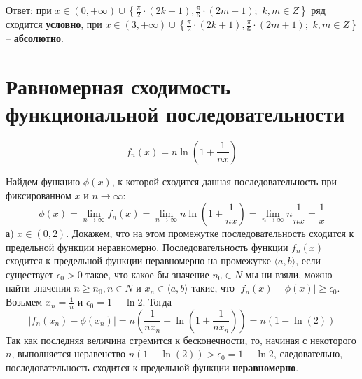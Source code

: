 \documentclass[a5paper, 10pt]{article}
\theoremstyle{definition}
\theoremstyle{plain}
\theoremstyle{remark}
\begin{document}
\underline{Ответ:} при $x \in (0, + \infty)  \cup \left\{  \frac{\pi}{2} \cdot (2k + 1), \frac{\pi}{6} \cdot (2m + 1); \,\, k ,  m\in Z\right\}$  ряд сходится \textbf{условно}, при $x \in (3, + \infty)  \cup \left\{  \frac{\pi}{2} \cdot (2k + 1), \frac{\pi}{6} \cdot (2m + 1); \,\, k ,  m\in Z\right\}$  -- \textbf{абсолютно}.


\newpage
\section{Равномерная сходимость функциональной последовательности}
\begin{equation*}
f_n (x) = n \ln \left( 1+ \frac{1}{nx} \right)
\end{equation*}

Найдем функцию $\phi(x)$, к которой сходится данная последовательность при фиксированном $x$ и $n \to \infty$:
\begin{equation}
\phi(x) = \lim_{n \to \infty} f_n (x) = \lim_{n \to \infty} n \ln \left( 1+ \frac{1}{nx} \right) =
\lim_{n \to \infty} n  \frac{1}{nx} = \frac{1}{x}
\end{equation}
а)  $x \in (0, 2)$. Докажем, что на этом промежутке последовательность сходится к предельной функции неравномерно. Последовательность функции $f_n (x)$ сходится к предельной функции неравномерно на промежутке $\langle a, b \rangle$, если существует $\epsilon_0 > 0$ такое, что какое бы значение $n_0 \in N$ мы ни взяли, можно найти значения $n \geq n_0, n \in N$ и $x_n \in \langle a, b \rangle$ такие, что $\left| f_n (x) - \phi(x)  \right| \geq \epsilon_0$. \\
Возьмем $x_n = \frac{1}{n}$ и $\epsilon_0 = 1 - \ln2$. Тогда
\begin{equation*}
\left| f_n (x_n) - \phi(x_n)  \right| = n \left( \frac{1}{nx_n}- \ln \left( 1+ \frac{1}{nx_n} \right)  \right) =  
 n \left( 1- \ln \left( 2 \right)  \right)
\end{equation*}
Так как последняя величина стремится к бесконечности, то, начиная с некоторого $n$, выполняется неравенство $ n \left( 1- \ln \left( 2 \right)  \right) > \epsilon_0 = 1 - \ln 2 $, следовательно, последовательность сходится к предельной функции \textbf{неравномерно}.\\
\end{document}

